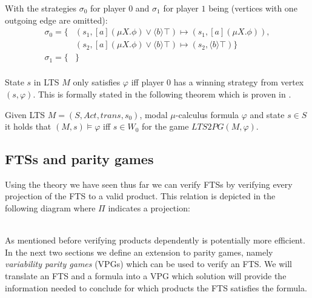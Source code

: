 With the strategies $\sigma_0$ for player $0$ and $\sigma_1$ for player $1$ being (vertices with one outgoing edge are omitted):
\begin{align*}
\sigma_0 = \{
&(s_1, [a](\mu X. \phi) \vee \langle b \rangle \top) \mapsto (s_1, [a] (\mu X. \phi)), \\
&(s_2, [a](\mu X. \phi) \vee \langle b \rangle \top) \mapsto (s_2, \langle b \rangle \top) \} \\
\sigma_1 = \{&\} \\
\end{align*}

State $s$ in LTS $M$ only satisfies $\varphi$ iff player $0$ has a winning strategy from vertex $(s, \varphi)$. This is formally stated in the following theorem which is proven in \cite{Bradfield2018}.
\begin{theorem}
	\label{the_LTS_PG_REL}Given LTS $M = (S, Act, trans, s_0)$, modal $\mu$-calculus formula $\varphi$ and state $s \in S$ it holds that $(M, s) \models \varphi$ iff $s \in W_0$ for the game $LTS2PG(M, \varphi)$.
\end{theorem}

\subsection{FTSs and parity games}
Using the theory we have seen thus far we can verify FTSs by verifying every projection of the FTS to a valid product. This relation is depicted in the following diagram where $\Pi$ indicates a projection:
\\\\
As mentioned before verifying products dependently is potentially more efficient. In the next two sections we define an extension to parity games, namely \textit{variability parity games} (VPGs) which can be used to verify an FTS. We will translate an FTS and a formula into a VPG which solution will provide the information needed to conclude for which products the FTS satisfies the formula.
